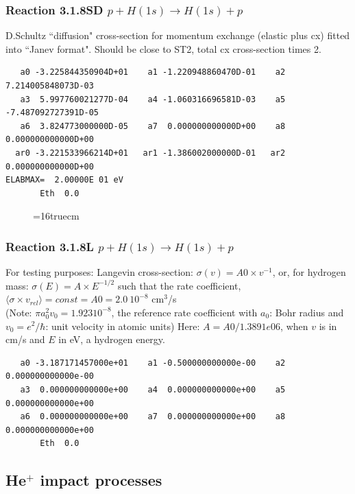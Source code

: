 \documentclass[12pt,dvipdfmx]{article}
\begin{document}
\subsubsection{
Reaction 3.1.8SD $  p + H(1s) \rightarrow H(1s) + p  $
}
D.Schultz ``diffusion" cross-section for momentum exchange (elastic plus cx)
fitted into ``Janev format". Should be close to ST2, total cx cross-section times 2.

\begin{small}\begin{verbatim}
   a0 -3.225844350904D+01    a1 -1.220948860470D-01    a2  7.214005848073D-03
   a3  5.997760021277D-04    a4 -1.060316696581D-03    a5 -7.487092727391D-05
   a6  3.824773000000D-05    a7  0.000000000000D+00    a8  0.000000000000D+00
  ar0 -3.221533966214D+01   ar1 -1.386002000000D-01   ar2  0.000000000000D+00
ELABMAX=  2.00000E 01 eV
       Eth  0.0
\end{verbatim}\end{small}


\begin{figure} \label{318RS}
\epsfxsize=16truecm
\end{figure}
\newpage
\subsubsection{
Reaction 3.1.8L $  p + H(1s) \rightarrow H(1s) + p  $
}
For testing purposes:
Langevin cross-section: $\sigma(v)=A0 \times v^{-1}$, or, for hydrogen mass: $\sigma(E)=A \times E^{-1/2}$
such that the rate coefficient,
$\langle\sigma \times v_{rel} \rangle= const = A0 = 2.0~ 10^{-8}$ cm$^3$/s\\
(Note: $\pi a_0^2 v_0 = 1.923 10^{-8}$, the reference rate coefficient with $a_0$: Bohr radius
and $v_0 =e^2/\hbar$: unit velocity in atomic units)
Here: $A = A0/1.3891e 06$, when $v$ is in cm/s and $E$ in eV, a hydrogen energy.

\begin{small}\begin{verbatim}
   a0 -3.187171457000e+01    a1 -0.500000000000e-00    a2  0.000000000000e-00
   a3  0.000000000000e+00    a4  0.000000000000e+00    a5  0.000000000000e+00
   a6  0.000000000000e+00    a7  0.000000000000e+00    a8  0.000000000000e+00
       Eth  0.0
\end{verbatim}\end{small}

\newpage
\subsection{He$^+$ impact processes}
\end{document}
